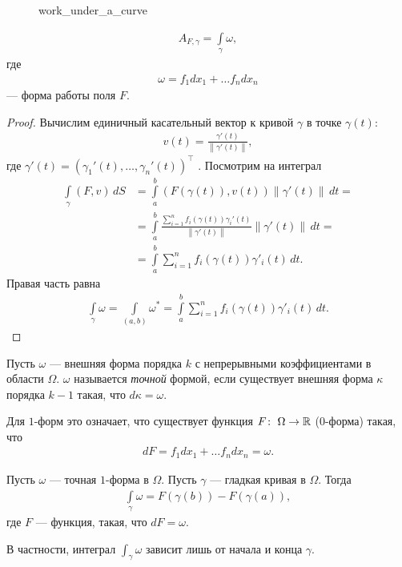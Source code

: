\begin{figure}[ht]
    \centering
    \caption{work_under_a_curve}
    \label{fig:work_under_a_curve}
\end{figure}

\begin{claim}
 \begin{align*}
  A_{F,\gamma} = \int\limits_{\gamma} \omega
 ,\end{align*} где
 \begin{align*}
  \omega = f_1 dx_1 + \ldots f_n dx_n
 \end{align*} --- форма работы поля $F$.
\end{claim}
\begin{proof}
 Вычислим единичный касательный вектор к кривой $\gamma$ в точке $\gamma(t)$:
 \begin{align*}
  v(t) = \frac{\gamma'(t)}{\left\| \gamma'(t) \right\|}
 ,\end{align*} где $\gamma'(t) = (\gamma_1'(t), \ldots, \gamma_n'(t))^{\top}$ . Посмотрим на интеграл
 \begin{align*}
  \int\limits_{\gamma} (F,v) \, dS &= \int\limits_{a}^{b} (F(\gamma(t)), v(t)) \left\| \gamma' (t) \right\| \, dt = \\ 
  &= \int\limits_{a}^{b} \frac{\sum_{i=1}^{n} f_i(\gamma(t))\gamma_i'(t)}{\left\| \gamma'(t) \right\|} \left\| \gamma'(t) \right\| \, dt = \\
  &= \int\limits_{a}^{b} \sum_{i=1}^{n} f_i(\gamma(t))\gamma'_i(t) \, dt 
 .\end{align*} Правая часть равна
 \begin{align*}
  \int\limits_{\gamma} \omega = \int\limits_{(a,b)} \omega^{\ast} = \int\limits_{a}^{b} \sum_{i=1}^{n} f_i(\gamma(t))\gamma'_i(t) \, dt
 .\end{align*} 
\end{proof}
\begin{df}
 Пусть $\omega$ --- внешняя форма порядка $k$ с непрерывными коэффициентами в области $\Omega$. $\omega$ называется \textit{точной} формой, если существует внешняя форма $\kappa$ порядка $k - 1$ такая, что $d \kappa = \omega$.

 Для $1$-форм это означает, что существует функция $F \colon\; \Omega \to \mathbb{R}$ ($0$-форма) такая, что
 \begin{align*}
  dF = f_1 dx_1 + \ldots f_n dx_n = \omega
 .\end{align*} 
\end{df}
\begin{claim}
 \label{claim:integral_of_potential_curve_is_difference_on_ends}
 Пусть $\omega$  --- точная $1$-форма в $\Omega$. Пусть $\gamma$  --- гладкая кривая в $\Omega$. Тогда
 \begin{align*}
  \int\limits_{\gamma} \omega = F(\gamma(b)) - F(\gamma(a))
 ,\end{align*} где $F$ --- функция, такая, что $dF = \omega$.

 В частности, интеграл $\int_{\gamma} \omega  $  зависит лишь от начала и конца $\gamma$.
\end{claim}

